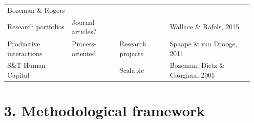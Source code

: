 \documentclass[]{elsarticle} %
\begin{document}
\begin{longtable}[]{@{}llll@{}}
\begin{minipage}[t]{0.16\columnwidth}
Bozeman \& Rogers\strut
\end{minipage}\tabularnewline
\begin{minipage}[t]{0.24\columnwidth}\raggedright
Research portfolios\strut
\end{minipage} & \begin{minipage}[t]{0.23\columnwidth}\raggedright
Journal articles?\strut
\end{minipage} & \begin{minipage}[t]{0.25\columnwidth}\raggedright
\strut
\end{minipage} & \begin{minipage}[t]{0.16\columnwidth}\raggedright
Wallace \& Rafols, 2015\strut
\end{minipage}\tabularnewline
\begin{minipage}[t]{0.24\columnwidth}\raggedright
Productive interactions\strut
\end{minipage} & \begin{minipage}[t]{0.23\columnwidth}\raggedright
Process-oriented\strut
\end{minipage} & \begin{minipage}[t]{0.25\columnwidth}\raggedright
Research projects\strut
\end{minipage} & \begin{minipage}[t]{0.16\columnwidth}\raggedright
Spaape \& van Drooge, 2011\strut
\end{minipage}\tabularnewline
\begin{minipage}[t]{0.24\columnwidth}\raggedright
S\&T Human Capital\strut
\end{minipage} & \begin{minipage}[t]{0.23\columnwidth}\raggedright
\strut
\end{minipage} & \begin{minipage}[t]{0.25\columnwidth}\raggedright
Scalable\strut
\end{minipage} & \begin{minipage}[t]{0.16\columnwidth}\raggedright
Bozeman, Dietz \& Gaughan, 2001\strut
\end{minipage}\tabularnewline
\bottomrule
\end{longtable}

\hypertarget{methodological-framework}{%
\section{3. Methodological framework}\label{methodological-framework}}
\end{document}
